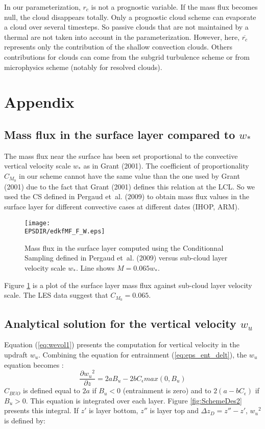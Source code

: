 In our parameterization, $r_c$ is not a prognostic variable. If the mass flux becomes null, the cloud disappears totally. Only a prognostic cloud scheme can evaporate a cloud over several timesteps. So passive clouds that are not maintained by a thermal are not taken into account in the parameterization. However, here, $\overline{r_c}$ represents only the contribution of the shallow convection clouds. Others contributions for clouds can come from the subgrid turbulence scheme or from microphysics scheme (notably for resolved clouds). 

\section{Appendix}
\subsection{Mass flux in the surface layer compared to $w_*$}
\label{sec:MF_W}

The mass flux near the surface has been set proportional to the convective vertical velocity scale $w_*$ as in Grant (2001). The coefficient of proportionality $C_{M_0}$ in our scheme cannot have the same value than the one used by Grant (2001) due to the fact that Grant (2001) defines this relation at the LCL. So we used the CS defined in Pergaud et~al. (2009) to obtain mass flux values in the surface layer for different convective cases at different dates (IHOP, ARM).

\begin{figure}
	\begin{center}
		\texttt{[image: \\EPSDIR/edkfMF\_F\_W.eps]}
	\end{center}
	\caption{Mass flux in the surface layer computed using the Conditionnal Sampling defined in Pergaud et~al. (2009) versus sub-cloud layer velocity scale $w_*$. Line shows $M=0.065w_*$.}
	\label{fig:MF_F_W}
\end{figure}

Figure \ref{fig:MF_F_W} is a plot of the surface layer mass flux against sub-cloud layer velocity scale. The LES data suggest that $C_{M_0}=0.065$.

\subsection{Analytical solution for the vertical velocity $w_u$}
\label{sec:annexe_w}
Equation (\ref{eq:wevol1}) presents the computation for vertical velocity in the updraft $w_u$. Combining the equation for entrainment (\ref{eq:eps_ent_delt}), the $w_u$ equation becomes :
\begin{equation}
   \frac{\partial{{w_u}^2}} {\partial{z}}=2 a B_u-2 b C_{\epsilon}max(0,B_u)
\label{eq:wevol2}
\end{equation}
$C_{BUO}$ is defined equal to $2a$ if $B_u<0$ (entrainment is zero) and to $2(a-bC_{\epsilon})$ if $B_u>0$.
This equation is integrated over each layer. Figure \ref{fig:SchemeDes2} presents this integral. If $z'$ is layer bottom, $z''$ is layer top and $\Delta z_D = z''-z'$,  ${w_u}^2$ is defined by:

